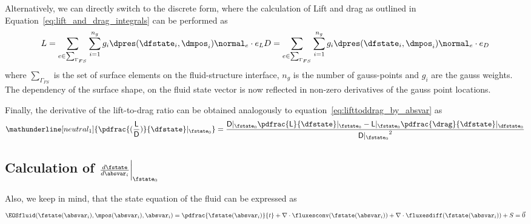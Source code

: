 \documentclass[../main.tex]{subfiles}
\begin{document}
Alternatively, we can directly switch to the discrete form, where the calculation of Lift and drag as outlined in Equation~\eqref{eq:lift_and_drag_integrals} can be performed as
\begin{align}\label{eq:discrete_lift_and_drag_formulas}
L=\sum_{e \in \sum_{\Gamma_{FS}}} \sum_{i=1}^{n_g} g_i \dpres(\dfstate_i,\dmpos_i) \normal_e \cdot e_L
D=\sum_{e \in \sum_{\Gamma_{FS}}} \sum_{i=1}^{n_g} g_i \dpres(\dfstate_i,\dmpos_i) \normal_e \cdot e_D
\end{align}
where $\sum_{\Gamma_{FS}}$ is the set of surface elements on the fluid-structure interface, $n_g$ is the number of gauss-points and $g_i$ are the gauss weights. The dependency of the surface shape, on the fluid state vector is now reflected in non-zero derivatives of the gauss point locations.

Finally, the derivative of the lift-to-drag ratio can be obtained analogously to equation~\eqref{eq:lifttoddrag_by_absvar} as
\begin{align}\label{eq:lifttodrag_by_dfstate}
\mathunderline[neutral_1]{\pdfrac{(\frac{\mathsf{L}}{\mathsf{D}})}{\dfstate}\rvert_{\fstate_0}}=
\frac{\mathsf{D}\rvert_{\fstate_0} \pdfrac{\mathsf{L}}{\dfstate}\rvert_{\fstate_0} - \mathsf{L}\rvert_{\fstate_0} \pdfrac{\drag}{\dfstate}\rvert_{\dfstate_0} }{{\mathsf{D}\rvert_{\fstate_0}}^2}
\end{align}


\subsection{Calculation of $\DfstateBYabsvarI\bigg\rvert_{\fstate_0}$}

Also, we keep in mind, that the state equation of the fluid can be expressed as
\begin{align}
\EOSfluid(\fstate(\absvar_i),\mpos(\absvar_i),\absvar_i)=
\pdfrac{\fstate(\absvar_i)}{t}+\nabla\cdot\fluxesconv(\fstate(\absvar_i))+\nabla\cdot\fluxesdiff(\fstate(\absvar_i))+S=
\vec{0}
\end{align}
\end{document}

